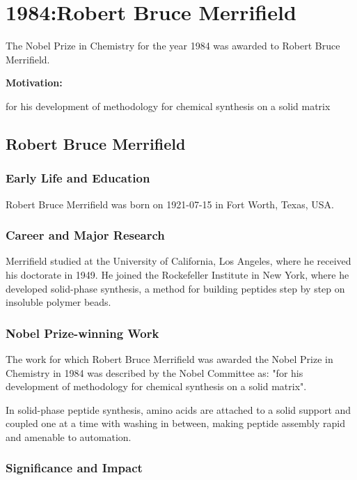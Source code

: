 \chapter{1984:Robert Bruce Merrifield}

\label{chap:chemistry1984}

The Nobel Prize in Chemistry for the year 1984 was awarded to Robert Bruce Merrifield.

\textbf{Motivation:}

for his development of methodology for chemical synthesis on a solid matrix

\section{Robert Bruce Merrifield}

\subsection*{Early Life and Education}

Robert Bruce Merrifield was born on 1921-07-15 in Fort Worth, Texas, USA.

\subsection*{Career and Major Research}

Merrifield studied at the University of California, Los Angeles, where he received his doctorate in 1949. He joined the Rockefeller Institute in New York, where he developed solid-phase synthesis, a method for building peptides step by step on insoluble polymer beads.

\subsection*{Nobel Prize-winning Work}

The work for which Robert Bruce Merrifield was awarded the Nobel Prize in Chemistry in 1984 was described by the Nobel Committee as: "for his development of methodology for chemical synthesis on a solid matrix".

In solid-phase peptide synthesis, amino acids are attached to a solid support and coupled one at a time with washing in between, making peptide assembly rapid and amenable to automation.

\subsection*{Significance and Impact}

